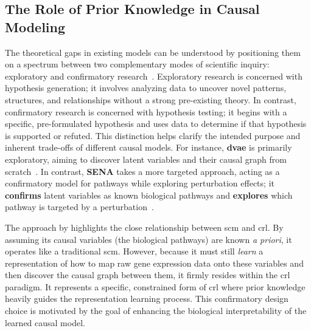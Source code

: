 \subsection{The Role of Prior Knowledge in Causal Modeling}
\label{app:proofs:prior_knowledge}

The theoretical gaps in existing models can be understood by positioning them on a spectrum between two complementary modes of scientific inquiry: exploratory and confirmatory research~\citep{pmlr-v235-herrmann24b}.
Exploratory research is concerned with hypothesis generation; it involves analyzing data to uncover novel patterns, structures, and relationships without a strong pre-existing theory.
In contrast, confirmatory research is concerned with hypothesis testing; it begins with a specific, pre-formulated hypothesis and uses data to determine if that hypothesis is supported or refuted.
This distinction helps clarify the intended purpose and inherent trade-offs of different causal models.
For instance, \textbf{\gls{dvae}} is primarily exploratory, aiming to discover latent variables and their causal graph from scratch~\citep{zhang2023identifiability}.
In contrast, \textbf{SENA} takes a more targeted approach, acting as a confirmatory model for pathways while exploring perturbation effects; it \textbf{confirms} latent variables as known biological pathways and \textbf{explores} which pathway is targeted by a perturbation~\citep{de2025interpretable}.

The approach by \citet{de2025interpretable} highlights the close relationship between \gls{scm} and \gls{crl}.
By assuming its causal variables (the biological pathways) are known \emph{a priori}, it operates like a traditional \gls{scm}.
However, because it must still \emph{learn} a representation of how to map raw gene expression data onto these variables and then discover the causal graph between them, it firmly resides within the \gls{crl} paradigm.
It represents a specific, constrained form of \gls{crl} where prior knowledge heavily guides the representation learning process.
This confirmatory design choice is motivated by the goal of enhancing the biological interpretability of the learned causal model.

